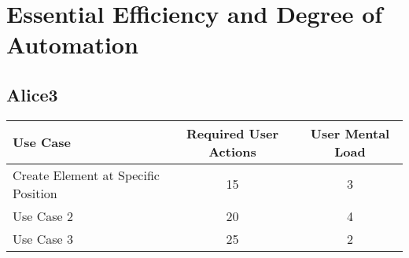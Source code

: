 \section{Essential Efficiency and Degree of Automation}

\subsection{Alice3}


\begin{tabular*}{\textwidth}{lcc}
\textbf{Use Case} & \textbf{Required User Actions} & \textbf{User Mental Load}\\
\hline
Create Element at Specific Position & 15 & 3 \\
Use Case 2                          & 20 & 4 \\
Use Case 3                          & 25 & 2
\end{tabular*}
